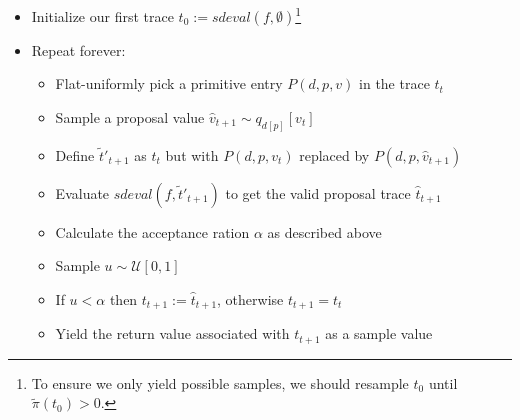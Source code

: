 \begin{minipage}{\linewidth}
\begin{itemize}
\item Initialize our first trace $t_0 := sdeval(f,\emptyset)$\footnote{To ensure we only yield possible samples, we should resample $t_0$ until $\tilde{\pi}(t_0) > 0$.}
\item Repeat forever:
  \begin{itemize}
  \item Flat-uniformly pick a primitive entry $P(d,p,v)$ in the trace $t_t$
  \item Sample a proposal value $\hat{v}_{t+1} \sim q_{d[p]}[v_t]$
  \item Define $\tilde{t}'_{t+1}$ as $t_t$ but with $P(d,p,v_t)$ replaced by $P(d,p,\hat{v}_{t+1})$
  \item Evaluate $sdeval(f,\tilde{t}'_{t+1})$ to get the valid proposal trace $\hat{t}_{t+1}$
  \item Calculate the acceptance ration $\alpha$ as described above
  \item Sample $u \sim \mathcal{U}[0,1]$
  \item If $u < \alpha$ then $t_{t+1} := \hat{t}_{t+1}$, otherwise $t_{t+1} = t_t$
  \item Yield the return value associated with $t_{t+1}$ as a sample value
  \end{itemize}
\end{itemize}
\end{minipage}
